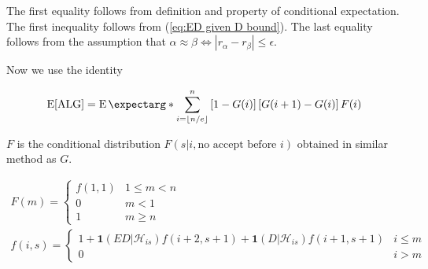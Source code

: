 \documentclass{article}
\newcommand{\expec}{\operatorname{E}}
\newcommand{\gt}{>}
\newcommand{\lt}{<}
\newcommand{\expect}{\operatorname{E}\expectarg}
\begin{document}
The first equality follows from definition and property of conditional expectation. The first inequality follows from (\ref{eq:ED given D bound}).  The last equality follows from the assumption that $\alpha \approx \beta \iff |r_\alpha - r_\beta|\leq \epsilon$.

Now we use the identity

\begin{equation*}
\expec[\ALG] = \expect*{\sum_{i=\lfloor n/e \rfloor}^n \left[1-G(i)\right] \left[G(i+1)-G(i)\right]F(i)}
\end{equation*}

$F$ is the conditional distribution $F(s | i, \text{no accept before }i)$ obtained in similar method as $G$.

\begin{gather*}
F(m) = \begin{cases}
f(1, 1) & 1\leq m\lt n\\
0 & m < 1\\
1 & m \geq n
\end{cases}\\
f(i,s) = \begin{cases} 
1+ \mathbf{1}(ED|\mathcal{H}_{is})f(i+2, s+1) + 
\mathbf{1}(D|\mathcal{H}_{is})f(i+1,s+1) & i\leq m \\
0 & i \gt m
\end{cases}
\end{gather*}
\end{document}
